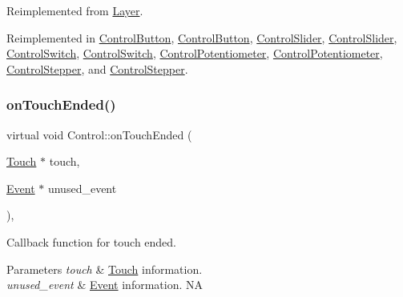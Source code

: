 Reimplemented from \hyperlink{classLayer_a9dbcca0eab3b0cd3cdc279615c604413}{Layer}.



Reimplemented in \hyperlink{classControlButton_a7597744c683964152429472a358b3fd2}{Control\+Button}, \hyperlink{classControlButton_a6f562dc0b399591189883ea7788603d7}{Control\+Button}, \hyperlink{classControlSlider_a9ba0559605c93e08dc4548261cbc2773}{Control\+Slider}, \hyperlink{classControlSlider_acdda8fa6365ab06db757c0a525c5108e}{Control\+Slider}, \hyperlink{classControlSwitch_a6976aba81f0846eb827114efc06301d3}{Control\+Switch}, \hyperlink{classControlSwitch_a13db70a616ea0e992710fc8041792f66}{Control\+Switch}, \hyperlink{classControlPotentiometer_adb487a04c463b3cfbf63be0957cee24c}{Control\+Potentiometer}, \hyperlink{classControlPotentiometer_adfd4029e5b390ba94a0ba0373adbc5d9}{Control\+Potentiometer}, \hyperlink{classControlStepper_a7934349dae09881fce7a72d4985d0154}{Control\+Stepper}, and \hyperlink{classControlStepper_a55e6582294a0520d21e397c3a58cf57b}{Control\+Stepper}.

\mbox{\label{classControl_af31a373d40a3181e2a97f0f9dc85c1f8}} 
\subsubsection{\texorpdfstring{on\+Touch\+Ended()}{onTouchEnded()}\hspace{0.1cm}{\footnotesize\ttfamily [2/2]}}
{\footnotesize\ttfamily virtual void Control\+::on\+Touch\+Ended (\begin{DoxyParamCaption}\item[{\hyperlink{classTouch}{Touch} $\ast$}]{touch,  }\item[{\hyperlink{classEvent}{Event} $\ast$}]{unused\+\_\+event }\end{DoxyParamCaption})\hspace{0.3cm}{\ttfamily [override]}, {\ttfamily [virtual]}}

Callback function for touch ended.


\begin{DoxyParams}{Parameters}
{\em touch} & \hyperlink{classTouch}{Touch} information. \\
\hline
{\em unused\+\_\+event} & \hyperlink{classEvent}{Event} information.  NA \\
\hline
\end{DoxyParams}


